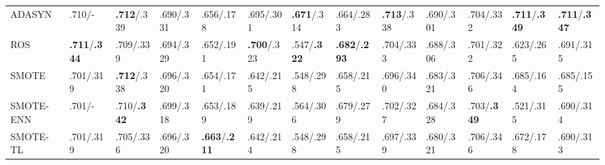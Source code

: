 \documentclass{sig-alternate-05-2015}
\begin{document}
\begin{table}
{\begin{tabular}{l|l|l|l|l|l|l|l|l|l|l|l|l}
				ADASYN&.710/-&\textbf{.712}/.339&.690/.331&.656/.178&.695/.301&\textbf{.671}/.314&.664/.283&\textbf{.713}/.338&.690/.301&.704/.332&\textbf{.711}/\textbf{.349}&\textbf{.711}/\textbf{.347}\\ 
				ROS&\textbf{.711}/\textbf{.344}&.709/.339&.694/.329&.652/.191&\textbf{.700}/.323&.547/\textbf{.322}&\textbf{.682}/\textbf{.293}&.704/.333&.688/.306&.701/.322&.623/.265&.691/.315\\
				SMOTE&.701/.319&\textbf{.712}/.338&.696/.320&.654/.171&.642/.215&.548/.298&.658/.215&.696/.340&.683/.321&.706/.346&.685/.164&.685/.155\\ 
				SMOTE-ENN&.701/-&.710/\textbf{.342}&.699/.318&.653/.189&.639/.219&.564/.306&.679/.279&.702/.327&.684/.328&.703/\textbf{.349}&.521/.315&.690/.314\\ 
				SMOTE-TL&.701/.319&.705/.336&.696/.320&\textbf{.663}/\textbf{.211}&.642/.214&.548/.298&.658/.215&.697/.339&.680/.321&.706/.346&.672/.178&.690/.313\\
				\hline				
		\end{tabular}}
		\vspace{0em}
	\end{table}
\end{document}
